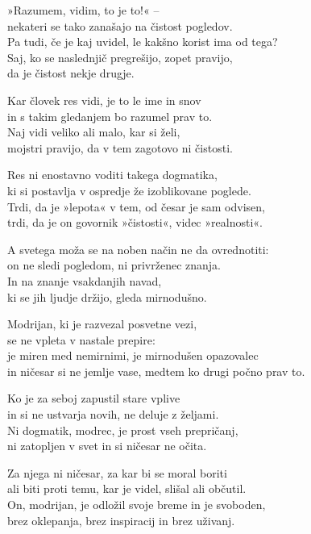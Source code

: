 »Razumem, vidim, to je to!« --\\
nekateri se tako zanašajo na čistost pogledov.\\
Pa tudi, če je kaj uvidel, le kakšno korist ima od tega?\\
Saj, ko se naslednjič pregrešijo, zopet pravijo,\\\vin da je čistost nekje drugje.

\clearpage

Kar človek res vidi, je to le ime in snov\\
in s takim gledanjem bo razumel prav to.\\
Naj vidi veliko ali malo, kar si želi,\\
mojstri pravijo, da v tem zagotovo ni čistosti.

Res ni enostavno voditi takega dogmatika,\\
ki si postavlja v ospredje že izoblikovane poglede.\\
Trdi, da je »lepota« v tem, od česar je sam odvisen,\\
trdi, da je on govornik »čistosti«, videc »realnosti«.

A svetega moža se na noben način ne da ovrednotiti:\\
on ne sledi pogledom, ni privrženec znanja.\\
In na znanje vsakdanjih navad,\\
ki se jih ljudje držijo, gleda mirnodušno.

Modrijan, ki je razvezal posvetne vezi,\\
se ne vpleta v nastale prepire:\\
je miren med nemirnimi, je mirnodušen opazovalec\\
in ničesar si ne jemlje vase, medtem ko drugi počno prav to.

Ko je za seboj zapustil stare vplive\\
in si ne ustvarja novih, ne deluje z željami.\\
Ni dogmatik, modrec, je prost vseh prepričanj,\\
ni zatopljen v svet in si ničesar ne očita.

\clearpage

Za njega ni ničesar, za kar bi se moral boriti\\
ali biti proti temu, kar je videl, slišal ali občutil.\\
On, modrijan, je odložil svoje breme in je svoboden,\\
brez oklepanja, brez inspiracij in brez uživanj.

